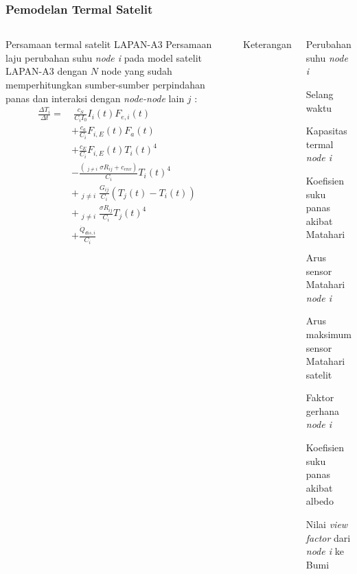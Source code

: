 \documentclass[8pt]{beamer}
\begin{document}
\begin{frame}
  \frametitle{Pemodelan Termal Satelit}
  \begin{columns}[T]
    \begin{block}{\normalsize Persamaan termal satelit LAPAN-A3}
      \small
  Persamaan laju perubahan suhu \textit{node i} pada model satelit LAPAN-A3 dengan $N$ node yang sudah memperhitungkan sumber-sumber perpindahan panas dan interaksi dengan \textit{node-node} lain $j$ \cite{martinez2022}:
\begin{equation}
\label{eq:lineq}
\begin{split}
	\frac{\Delta T_i}{\Delta t} = &\ \frac{c_S}{C_i I_0} I_{i}(t) F_{e,i}(t) \\
	&+ \frac{c_a}{C_i} F_{i,E}(t) F_a(t) \\
	&+ \frac{c_E}{C_i} F_{i,E}(t) T_{i}(t)^4 \\
	&- \frac{\left( \mathop{\sum_{j=1}^{N}}_{j \neq i} \sigma R_{ij} + c_{env} \right) }{C_i} T_{i}(t)^4 \\
	&+ \mathop{\sum_{j=1}^{N}}_{j \neq i} \frac{G_{ij}}{C_i} \left(T_j(t) - T_i(t)\right) \\
	&+ \mathop{\sum_{j=1}^{N}}_{j \neq i} \frac{\sigma R_{ij}}{C_i}T_{j}(t)^4 \\
	&+ \frac{\dot{Q}_{dis,i}}{C_i}
\end{split}
\end{equation}
    \end{block}
      \begin{center}Keterangan\end{center}
      \begin{description}
          \tiny
        \item[$\Delta T_{i}$] Perubahan suhu \textit{node i}
        \item[$\Delta t_{i}$] Selang waktu
        \item[$C_{i}$] Kapasitas termal \textit{node i}
        \item[$c_S$] Koefisien suku panas akibat Matahari
        \item[$I_{i}$] Arus sensor Matahari \textit{node i}
        \item[$I_{0}$] Arus maksimum sensor Matahari satelit
        \item[$F_{e,i}$] Faktor gerhana \textit{node i}
        \item[$c_{a}$] Koefisien suku panas akibat albedo
        \item[$F_{i,E}$] Nilai \textit{view factor} dari \textit{node i} ke Bumi

\end{description}
\end{columns}
\end{frame}
\end{document}
